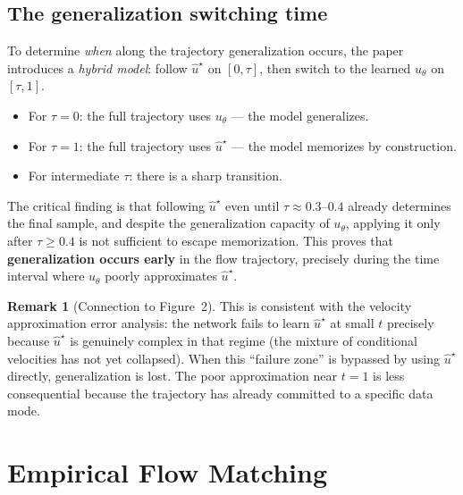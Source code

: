 \documentclass[10pt,a4paper]{article}
\theoremstyle{definition}
\newtheorem{remark}{Remark}
\begin{document}
\subsection{The generalization switching time}\label{subsec:switching}

To determine \emph{when} along the trajectory generalization occurs, the paper introduces a \emph{hybrid model}: follow $\hat{u}^\star$ on $[0, \tau]$, then switch to the learned $u_\theta$ on $[\tau, 1]$.

\begin{itemize}[nosep,leftmargin=1.5em]
    \item For $\tau = 0$: the full trajectory uses $u_\theta$ --- the model generalizes.
    \item For $\tau = 1$: the full trajectory uses $\hat{u}^\star$ --- the model memorizes by construction.
    \item For intermediate $\tau$: there is a sharp transition.
\end{itemize}

The critical finding is that following $\hat{u}^\star$ even until $\tau \approx 0.3$--$0.4$ already determines the final sample, and despite the generalization capacity of $u_\theta$, applying it only after $\tau \geq 0.4$ is not sufficient to escape memorization.
This proves that \textbf{generalization occurs early} in the flow trajectory, precisely during the time interval where $u_\theta$ poorly approximates $\hat{u}^\star$.

\begin{remark}[Connection to Figure~2]
This is consistent with the velocity approximation error analysis: the network fails to learn $\hat{u}^\star$ at small $t$ precisely because $\hat{u}^\star$ is genuinely complex in that regime (the mixture of conditional velocities has not yet collapsed).
When this ``failure zone'' is bypassed by using $\hat{u}^\star$ directly, generalization is lost.
The poor approximation near $t = 1$ is less consequential because the trajectory has already committed to a specific data mode.
\end{remark}

\section{Empirical Flow Matching}\label{sec:efm}
\end{document}
